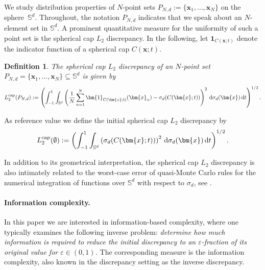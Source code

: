 \documentclass[12pt]{article}
\newcommand{\cp}{{\rm cap}}
\newtheorem{definition}{Definition}
\begin{document}
We study distribution properties of $N$-point sets $P_{N,d} :=\{\bm{x}_1,\ldots,\bm{x}_N\}$ on the sphere~$\mathbb{S}^d$. Throughout, the notation $P_{N,d}$ indicates that we speak about an $N$-element set in $\mathbb{S}^d$. A prominent quantitative measure for the uniformity of such a point set is the spherical cap $L_2$ discrepancy. In the following, let $\bm{1}_{C(\bm{x}; t)}$ denote the indicator function of a spherical cap $C(\bm{x}; t)$.



\begin{definition}\label{def1}\rm
The spherical cap $L_2$ discrepancy of an $N$-point set $P_{N,d} = \{ \bm{x}_1, \ldots, \bm{x}_N\} \subseteq \mathbb{S}^d$ is given by
\begin{equation*}
L_2^{\cp}(P_{N,d}):= \left( \int_{-1}^1 \int_{\mathbb{S}^d} \left( \frac{1}{N} \sum_{n=1}^N \bm{1}_{C(\bm{x}; t)}(\bm{x}_n) - \sigma_d(C(\bm{x}; t)) \right)^2 \,\mathrm{d} \sigma_d(\bm{x}) \,\mathrm{d} t \right)^{1/2}.
\end{equation*}
\end{definition}
As reference value we define the initial spherical cap $L_2$ discrepancy by
\begin{equation*}
L_2^{\cp}(\emptyset) := \left(\int_{-1}^1 \int_{\mathbb{S}^d} \left( \sigma_d(C(\bm{x}; t)) \right)^2 \,\mathrm{d} \sigma_d(\bm{x}) \,\mathrm{d} t\right)^{1/2}.
\end{equation*}

In addition to its geometrical interpretation, the spherical cap $L_2$ discrepancy is also intimately related to the worst-case error of quasi-Monte Carlo rules for the numerical integration of functions over $\mathbb{S}^d$ with respect to $\sigma_d$, see \cite{BD13a,BSSW14,DP14a}.



\paragraph{Information complexity.} In this paper we are interested in information-based complexity, where one typically examines the following inverse problem: \emph{determine how much information is required to reduce the initial discrepancy to an $\varepsilon$-fraction of its original value for $\varepsilon \in (0,1)$.} The corresponding measure is the information complexity, also known in the discrepancy setting as the inverse discrepancy.
\end{document}
